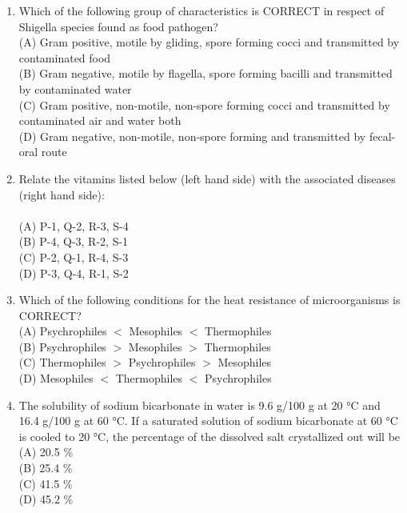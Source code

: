 \documentclass[journal,12pt,onecolumn]{IEEEtran}
\begin{document}
\begin{enumerate}
\item Which of the following group of characteristics is CORRECT in respect of Shigella species found as food pathogen?
\vspace{0.2cm}
\hfill{} \\
(A) Gram positive, motile by gliding, spore forming cocci and transmitted by contaminated food \\
(B) Gram negative, motile by flagella, spore forming bacilli and transmitted by contaminated water \\
(C) Gram positive, non-motile, non-spore forming cocci and transmitted by contaminated air and water both \\
(D) Gram negative, non-motile, non-spore forming and transmitted by fecal-oral route
\vspace{0.5cm}

\item Relate the vitamins listed below (left hand side) with the associated diseases (right hand side):
\vspace{0.2cm}\\



\vspace{0.2cm}
\hfill{} \\
(A) P-1, Q-2, R-3, S-4 \\
(B) P-4, Q-3, R-2, S-1 \\
(C) P-2, Q-1, R-4, S-3 \\
(D) P-3, Q-4, R-1, S-2
\vspace{0.5cm}

\item Which of the following conditions for the heat resistance of microorganisms is CORRECT?
\vspace{0.2cm}
\hfill{} \\
(A) Psychrophiles $<$ Mesophiles $<$ Thermophiles \\
(B) Psychrophiles $>$ Mesophiles $>$ Thermophiles \\
(C) Thermophiles $>$ Psychrophiles $>$ Mesophiles \\
(D) Mesophiles $<$ Thermophiles $<$ Psychrophiles
\vspace{0.5cm}

\item The solubility of sodium bicarbonate in water is 9.6 g/100 g at 20 °C and 16.4 g/100 g at 60 °C. If a saturated solution of sodium bicarbonate at 60 °C is cooled to 20 °C, the percentage of the dissolved salt crystallized out will be
\vspace{0.2cm}
\hfill{} \\
(A) 20.5 \% \\
(B) 25.4 \% \\
(C) 41.5 \% \\
(D) 45.2 \%
\vspace{0.5cm}


\end{enumerate}
\end{document}
